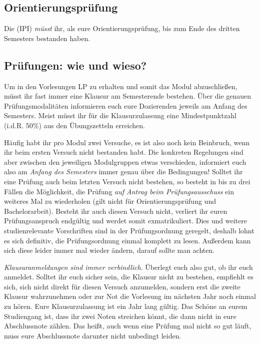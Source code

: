 \subsection{Orientierungsprüfung}

Die  (\gls{IPI}) \emph{müsst} ihr, als eure Orientierungsprüfung, bis zum Ende des dritten Semesters bestanden haben.


\subsection{Prüfungen: wie und wieso?}

Um in den Vorlesungen \gls{LP} zu erhalten und somit das Modul abzuschließen, müsst ihr fast immer eine Klausur am Semesterende bestehen. Über die genauen Prüfungsmodalitäten informieren euch eure Dozierenden jeweils am Anfang des Semesters. Meist müsst ihr für die Klausurzulassung eine Mindestpunktzahl (i.d.R. 50\%) aus den Übungszetteln erreichen.

Häufig habt ihr pro Modul zwei Versuche, es ist also noch kein Beinbruch, wenn ihr beim ersten Versuch nicht bestanden habt. Die konkreten Regelungen sind aber zwischen den jeweiligen Modulgruppen etwas verschieden, informiert euch also am \emph{Anfang des Semesters} immer genau über die Bedingungen! Solltet ihr eine Prüfung auch beim letzten Versuch nicht bestehen, so besteht in bis zu drei Fällen die Möglichkeit, die Prüfung \emph{auf Antrag beim Prüfungsausschuss} ein weiteres Mal zu wiederholen (gilt nicht für Orientierungsprüfung und Bachelorarbeit). Besteht ihr auch diesen Versuch nicht, verliert ihr euren Prüfungsanspruch endgültig und werdet somit exmatrikuliert. Dies und weitere studienrelevante Vorschriften sind in der Prüfungsordnung geregelt, deshalb lohnt es sich definitiv, die Prüfungsordnung einmal komplett zu lesen. Außerdem kann sich diese leider immer mal wieder ändern, darauf sollte man achten.

\emph{Klausuranmeldungen sind immer verbindlich}. Überlegt euch also gut, ob ihr euch anmeldet. Solltet ihr euch sicher sein, die Klausur nicht zu bestehen, empfiehlt es sich, sich nicht direkt für diesen Versuch anzumelden, sondern erst die zweite Klausur wahrzunehmen oder zur Not die Vorlesung im nächsten Jahr noch einmal zu hören. Eure Klausurzulassung ist ein Jahr lang gültig. Das Schöne an eurem Studiengang ist, dass ihr zwei Noten streichen könnt, die dann nicht in eure Abschlussnote zählen. Das heißt, auch wenn eine Prüfung mal nicht so gut läuft, muss eure Abschlussnote darunter nicht unbedingt leiden.

